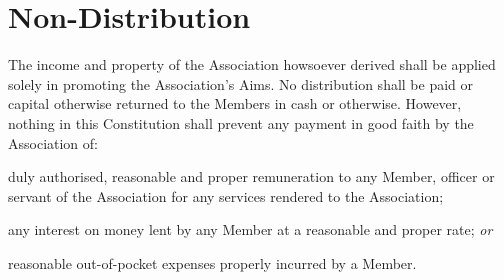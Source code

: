 \documentclass[12pt]{article}
\newcommand{\ITor}[0]{\textit{or}}
\begin{document}

\section{Non-Distribution}

  The income and property of the Association howsoever derived shall be
  applied solely in promoting the Association’s Aims. No distribution shall
  be paid or capital otherwise returned to the Members in cash or otherwise.
  However, nothing in this Constitution shall prevent any payment in good
  faith by the Association of:
  \begin{constenum}
  \item duly authorised, reasonable and proper remuneration to any Member,
    officer or servant of the Association for any services rendered to the
    Association;
  \item any interest on money lent by any Member at a reasonable and proper
    rate; \ITor
  \item reasonable out-of-pocket expenses properly incurred by a Member.
  \end{constenum}



\newpage
\end{document}
